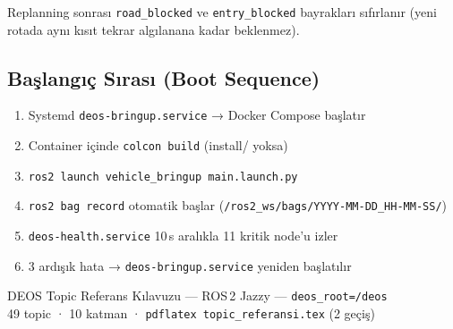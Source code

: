 \documentclass[11pt,a4paper]{article}
\begin{document}
Replanning sonrası \texttt{road\_blocked} ve \texttt{entry\_blocked} bayrakları
sıfırlanır (yeni rotada aynı kısıt tekrar algılanana kadar beklenmez).

\subsection{Başlangıç Sırası (Boot Sequence)}

\begin{enumerate}[noitemsep, topsep=4pt]
  \item Systemd \texttt{deos-bringup.service} → Docker Compose başlatır
  \item Container içinde \texttt{colcon build} (install/ yoksa)
  \item \texttt{ros2 launch vehicle\_bringup main.launch.py}
  \item \texttt{ros2 bag record} otomatik başlar (\texttt{/ros2\_ws/bags/YYYY-MM-DD\_HH-MM-SS/})
  \item \texttt{deos-health.service} 10\,s aralıkla 11 kritik node'u izler
  \item 3 ardışık hata → \texttt{deos-bringup.service} yeniden başlatılır
\end{enumerate}

\vfill
\begin{center}
\small\color{gray}
DEOS Topic Referans Kılavuzu — ROS\,2 Jazzy — \texttt{deos\_root=/deos}\\
49 topic · 10 katman · \texttt{pdflatex topic\_referansi.tex} (2 geçiş)
\end{center}
\end{document}
